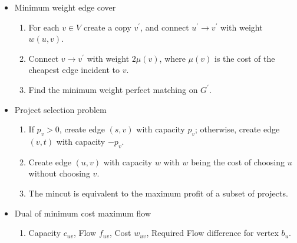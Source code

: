\begin{itemize}
\begin{enumerate}
        \item Binary search on answer, suppose we're checking answer $T$
        \item Construct a max flow model, let $K$ be the sum of all weights
        \item Connect source $s \rightarrow v$, $v \in G$ with capacity $K$
        \item For each edge $(u, v, w)$ in $G$, connect $u \rightarrow v$ and $v \rightarrow u$ with capacity $w$
        \item For $v \in G$, connect it with sink $v \rightarrow t$ with capacity $K + 2T - (\sum_{e \in E(v)}{w(e)}) - 2w(v)$
        \item $T$ is a valid answer if the maximum flow $f < K \lvert V \rvert$
    \end{enumerate}
    \item Minimum weight edge cover
    \begin{enumerate}
      \item For each $v \in V$ create a copy $v^\prime$, and connect $u^\prime \to v^\prime$ with weight $w(u, v)$.
      \item Connect $v \to v^\prime$ with weight $2\mu(v)$, where $\mu(v)$ is the cost of the cheapest edge incident to $v$.
      \item Find the minimum weight perfect matching on $G^\prime$.
    \end{enumerate}
    \item Project selection problem
    \begin{enumerate}
      \item If $p_v > 0$, create edge $(s, v)$ with capacity $p_v$; otherwise, create edge $(v, t)$ with capacity $-p_v$.
      \item Create edge $(u, v)$ with capacity $w$ with $w$ being the cost of choosing $u$ without choosing $v$.
      \item The mincut is equivalent to the maximum profit of a subset of projects.
    \end{enumerate}
    \item Dual of minimum cost maximum flow
    \begin{enumerate}
      \item Capacity $c_{uv}$, Flow $f_{uv}$, Cost $w_{uv}$, Required Flow difference for vertex $b_u$.

\end{enumerate}
\end{itemize}
